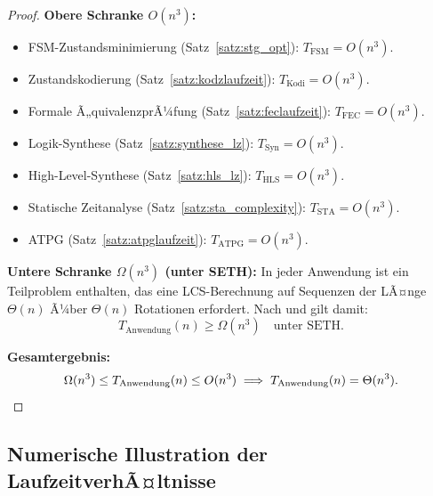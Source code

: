 ﻿\documentclass[a4paper,12pt]{article}
\theoremstyle{definition}
\begin{document}
\begin{proof}
  \textbf{Obere Schranke $O(n^3)$:}
  \begin{itemize}
    \item FSM-Zustandsminimierung (Satz~\ref{satz:stg_opt}): $T_{\text{FSM}} = O(n^3)$.
    \item Zustandskodierung (Satz~\ref{satz:kodzlaufzeit}): $T_{\text{Kodi}} = O(n^3)$.
    \item Formale Ã„quivalenzprÃ¼fung (Satz~\ref{satz:feclaufzeit}): $T_{\text{FEC}} = O(n^3)$.
    \item Logik-Synthese (Satz~\ref{satz:synthese_lz}): $T_{\text{Syn}} = O(n^3)$.
    \item High-Level-Synthese (Satz~\ref{satz:hls_lz}): $T_{\text{HLS}} = O(n^3)$.
    \item Statische Zeitanalyse (Satz~\ref{satz:sta_complexity}): $T_{\text{STA}} = O(n^3)$.
    \item ATPG (Satz~\ref{satz:atpglaufzeit}): $T_{\text{ATPG}} = O(n^3)$.
  \end{itemize}

  \textbf{Untere Schranke $\Omega(n^3)$ (unter SETH):}
  In jeder Anwendung ist ein Teilproblem enthalten, das eine LCS-Berechnung auf
  Sequenzen der LÃ¤nge $\Theta(n)$ Ã¼ber $\Theta(n)$ Rotationen erfordert. Nach
  \cite[Satz~1]{subgraph2026} und \cite{abboud2015tight} gilt damit:
  \[
    T_{\text{Anwendung}}(n) \geq \Omega(n^3) \quad \text{unter SETH}.
  \]

  \textbf{Gesamtergebnis:}
  \[
    \Omega(n^3) \leq T_{\text{Anwendung}}(n) \leq O(n^3) \implies T_{\text{Anwendung}}(n) = \Theta(n^3).
    \qedhere
  \]
\end{proof}

\subsection{Numerische Illustration der LaufzeitverhÃ¤ltnisse}
\end{document}
